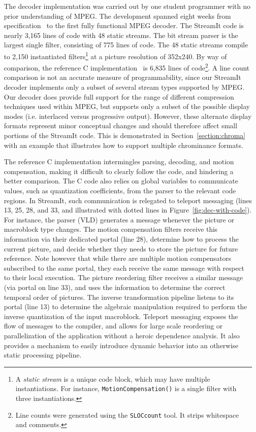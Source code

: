 The decoder implementation was carried out by one student programmer
with no prior understanding of MPEG. The development spanned eight
weeks from specification~\cite{MPEG2} to the first fully functional
MPEG decoder. The StreamIt code is nearly 3,165 lines of code with 48
static streams. The bit stream parser is the largest single filter,
consisting of 775 lines of code. The 48 static streams compile to
2,150 instantiated filters\footnote{A  {\it static stream} is a unique
code block, which may have multiple instantiations. For instance,
\texttt{MotionCompensation()} is a single filter with three
instantiations.} at a picture resolution of 352x240. By way of
comparison, the reference C implementation~\cite{reference-mpeg-c} is
6,835 lines of code\footnote{Line counts were generated using  the
\texttt{SLOCcount} tool. It strips whitespace and comments.}.  A line
count comparison is not an accurate measure of programmability, since
our StreamIt decoder implements only a subset of several stream types
supported by MPEG.  Our decoder does provide full support for the
range of different compression techniques used within MPEG, but
supports only a subset of the possible display modes (i.e. interlaced
versus progressive output).  However, these alternate display formats
represent minor conceptual changes and should therefore affect small
portions of the StreamIt code. This is demonstrated in
Section~\ref{section:chroma} with an example that illustrates how to
support multiple chrominance formats.

The reference C implementation intermingles parsing, decoding, and
motion compensation, making it difficult to clearly follow the code,
and hindering a better comparison. The C code also relies on global
variables to communicate values, such as quantization coefficients,
from the parser to the relevant code regions. In StreamIt, such
communication is relegated to teleport messaging (lines 13, 25, 28, and
33, and illustrated with dotted lines in
Figure~\ref{fig:dec-with-code}). For instance, the parser (VLD)
generates a message whenever the picture or macroblock type
changes. The motion compensation filters receive this information via
their dedicated portal (line 28), determine how to process the current
picture, and decide whether they needs to store the picture for future
reference. Note however that while there are multiple motion compensators
subscribed to the same portal, they each receive the same message with
respect to their local execution.
The picture reordering filter receives a similar message
(via portal on line 33), and uses the information to determine the
correct temporal order of pictures. The inverse transformation
pipeline listens to its portal (line 13) to determine the algebraic
manipulation required to perform the inverse quantization of the input
macroblock. Teleport messaging 
exposes the flow of messages to the compiler, and allows for large
scale reordering or parallelization of the application without a
heroic dependence analysis. It also provides a mechanism to easily
introduce dynamic behavior into an otherwise static processing pipeline.

